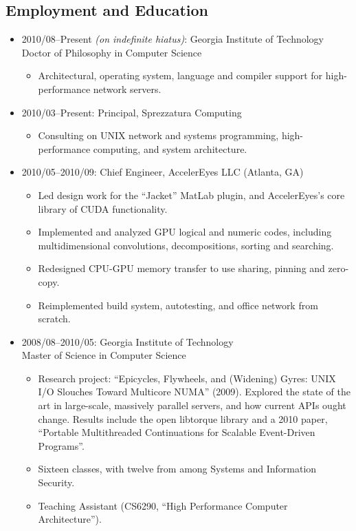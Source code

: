 \documentclass{article}
\newenvironment{tightitemize}
{\begin{itemize}
  \setlength{\itemsep}{1pt}
  \setlength{\parskip}{0pt}
  \setlength{\parsep}{0pt}}
{\end{itemize}}
\begin{document}
\subsection*{Employment and Education}
\begin{tightitemize}
\item 2010/08--Present \textit{(on indefinite hiatus)}: Georgia Institute of Technology\\
Doctor of Philosophy in Computer Science
\begin{tightitemize}
\item Architectural, operating system, language and compiler support for high-performance network servers.
\end{tightitemize}

\item 2010/03--Present: Principal, Sprezzatura Computing
\begin{tightitemize}
\item Consulting on UNIX network and systems programming, high-performance
  computing, and system architecture.
\end{tightitemize}

\item 2010/05--2010/09: Chief Engineer, AccelerEyes LLC (Atlanta, GA)
\begin{tightitemize}
\item Led design work for the ``Jacket'' MatLab plugin, and AccelerEyes's core library of CUDA functionality.
\item Implemented and analyzed GPU logical and numeric codes, including multidimensional convolutions, decompositions, sorting and searching.
\item Redesigned CPU-GPU memory transfer to use sharing, pinning and zero-copy.
\item Reimplemented build system, autotesting, and office network from scratch.
\end{tightitemize}

\item 2008/08--2010/05: Georgia Institute of Technology\\
Master of Science in Computer Science
\begin{tightitemize}
\item Research project: ``Epicycles, Flywheels, and (Widening) Gyres: UNIX I/O
  Slouches Toward Multicore NUMA'' (2009). Explored the state of the art in
  large-scale, massively parallel servers, and how current APIs ought
  change. Results include the open libtorque library and a 2010 paper,
  ``Portable Multithreaded Continuations for Scalable Event-Driven Programs''.
\item Sixteen classes, with twelve from among Systems and Information Security.
\item Teaching Assistant (CS6290, ``High Performance Computer Architecture'').
\end{tightitemize}


\end{tightitemize}
\end{document}

